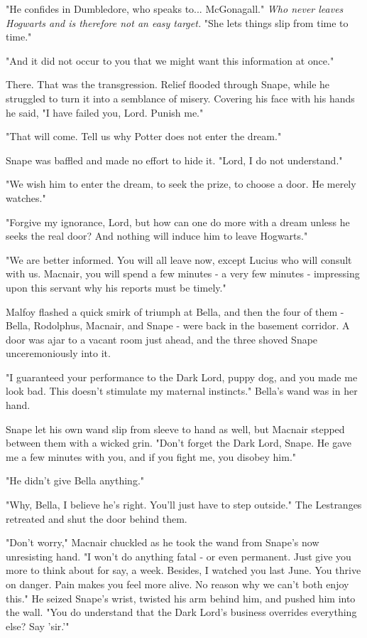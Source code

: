 \documentclass[a4paper,11pt]{article}
\begin{document}
"He confides in Dumbledore, who speaks to... McGonagall." \emph{Who never leaves Hogwarts and is therefore not an easy target.} "She lets things slip from time to time."

"And it did not occur to you that we might want this information at once."

There. That was the transgression. Relief flooded through Snape, while he struggled to turn it into a semblance of misery. Covering his face with his hands he said, "I have failed you, Lord. Punish me."

"That will come. Tell us why Potter does not enter the dream."

Snape was baffled and made no effort to hide it. "Lord, I do not understand."

"We wish him to enter the dream, to seek the prize, to choose a door. He merely watches."

"Forgive my ignorance, Lord, but how can one do more with a dream unless he seeks the real door? And nothing will induce him to leave Hogwarts."

"We are better informed. You will all leave now, except Lucius who will consult with us. Macnair, you will spend a few minutes - a very few minutes - impressing upon this servant why his reports must be timely."

Malfoy flashed a quick smirk of triumph at Bella, and then the four of them - Bella, Rodolphus, Macnair, and Snape - were back in the basement corridor. A door was ajar to a vacant room just ahead, and the three shoved Snape unceremoniously into it.

"I guaranteed your performance to the Dark Lord, puppy dog, and you made me look bad. This doesn't stimulate my maternal instincts." Bella's wand was in her hand.

Snape let his own wand slip from sleeve to hand as well, but Macnair stepped between them with a wicked grin. "Don't forget the Dark Lord, Snape. He gave me a few minutes with you, and if you fight me, you disobey him."

"He didn't give Bella anything."

"Why, Bella, I believe he's right. You'll just have to step outside." The Lestranges retreated and shut the door behind them.

"Don't worry," Macnair chuckled as he took the wand from Snape's now unresisting hand. "I won't do anything fatal - or even permanent. Just give you more to think about for say, a week. Besides, I watched you last June. You thrive on danger. Pain makes you feel more alive. No reason why we can't both enjoy this." He seized Snape's wrist, twisted his arm behind him, and pushed him into the wall. "You do understand that the Dark Lord's business overrides everything else? Say 'sir.'"
\end{document}
